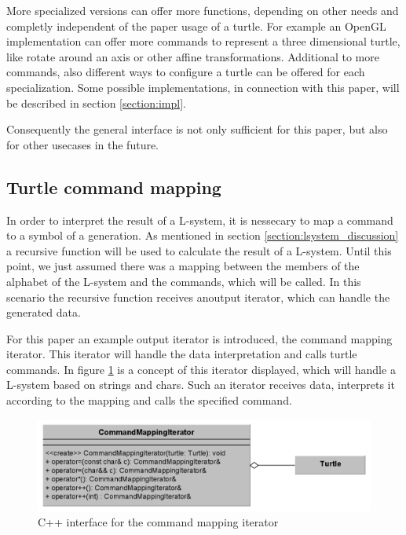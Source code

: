 \documentclass[english]{cpp-hmwk}
\begin{document}
\medskip
\noindent More specialized versions can offer more functions, depending on other needs and completly independent of the paper usage of a turtle. For example an OpenGL implementation can offer more commands to represent a three dimensional turtle, like rotate around an axis or other affine transformations. Additional to more commands, also different ways to configure a turtle can be offered for each specialization. Some possible implementations, in connection with this paper, will be described in section \ref{section:impl}.

Consequently the general interface is not only sufficient for this paper, but also for other usecases in the future.

\subsection{Turtle command mapping}
\label{section:turtle_mapping}
In order to interpret the result of a L-system, it is nessecary to map a command to a symbol of a generation. As mentioned in section \ref{section:lsystem_discussion} a recursive function will be used to calculate the result of a L-system. Until this point, we just assumed there was a mapping between the members of the alphabet of the L-system and the commands, which will be called. In this scenario the recursive function receives anoutput  iterator, which can handle the generated data. 

For this paper an example output iterator is introduced, the command mapping iterator. This iterator will handle the data interpretation and calls turtle commands. In figure \ref{figure:if_command_map} is a concept of this iterator displayed, which will handle a L-system based on strings and chars. Such an iterator receives data, interprets it according to the mapping and calls the specified command.

\begin{figure}[h!]
	\centering
	\includegraphics[width=1\columnwidth]{../graphs/LSystem/examples/class_command_mapping_iterator.png}
	\caption{C++ interface for the command mapping iterator}
	\label{figure:if_command_map}
\end{figure}
\end{document}
